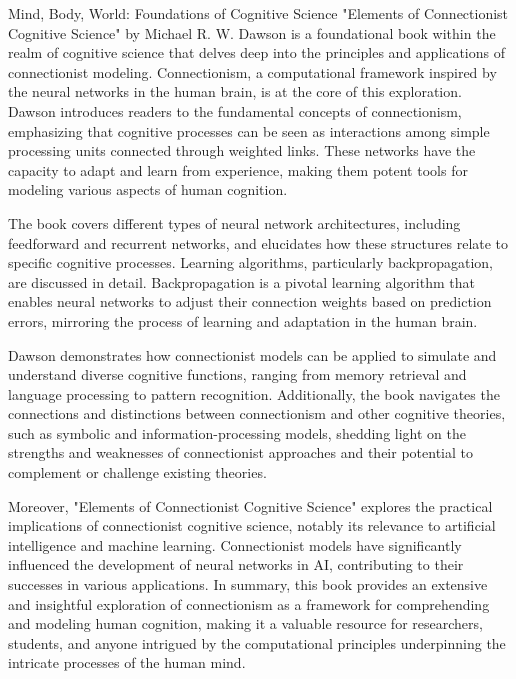 \begin{notes}{Mind, Body, World: Foundations of Cognitive Science}
    "Elements of Connectionist Cognitive Science" by Michael R. W. Dawson is a foundational book within the realm of cognitive science that delves deep into the principles and applications of 
    connectionist modeling. Connectionism, a computational framework inspired by the neural networks in the human brain, is at the core of this exploration. Dawson introduces readers to the 
    fundamental concepts of connectionism, emphasizing that cognitive processes can be seen as interactions among simple processing units connected through weighted links. These networks have the 
    capacity to adapt and learn from experience, making them potent tools for modeling various aspects of human cognition.

    The book covers different types of neural network architectures, including feedforward and recurrent networks, and elucidates how these structures relate to specific cognitive processes. Learning 
    algorithms, particularly backpropagation, are discussed in detail. Backpropagation is a pivotal learning algorithm that enables neural networks to adjust their connection weights based on prediction 
    errors, mirroring the process of learning and adaptation in the human brain.
    
    Dawson demonstrates how connectionist models can be applied to simulate and understand diverse cognitive functions, ranging from memory retrieval and language processing to pattern recognition. 
    Additionally, the book navigates the connections and distinctions between connectionism and other cognitive theories, such as symbolic and information-processing models, shedding light on the 
    strengths and weaknesses of connectionist approaches and their potential to complement or challenge existing theories.
    
    Moreover, "Elements of Connectionist Cognitive Science" explores the practical implications of connectionist cognitive science, notably its relevance to artificial intelligence and machine learning. 
    Connectionist models have significantly influenced the development of neural networks in AI, contributing to their successes in various applications. In summary, this book provides an extensive and 
    insightful exploration of connectionism as a framework for comprehending and modeling human cognition, making it a valuable resource for researchers, students, and anyone intrigued by the computational 
    principles underpinning the intricate processes of the human mind.
\end{notes}